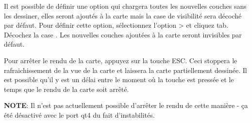 %

\label{label_settinglayer}

Il est possible de définir une option qui chargera toutes les nouvelles couches sans les dessiner, elles seront ajoutés à la carte mais la case de visibilité sera décoché par défaut. Pour définir cette option, sélectionnez l'option  >  et cliquez  tab. Décochez la case . Les nouvelles couches ajoutées à la carte seront invisibles par défaut.


\label{label_stoprender}

Pour arrêter le rendu de la carte, appuyez sur la touche ESC. Ceci stoppera le rafraichissement de la vue de la carte et laissera la carte partiellement dessinée. Il est possible qu'il y est un délai entre le moment où la touche est pressée et le temps que le rendu de la carte soit arrêté.

\textbf{NOTE}: Il n'est pas actuellement possible d'arrêter le rendu de cette manière - ça été désactivé avec le port qt4 du fait d'instabilités.

%

